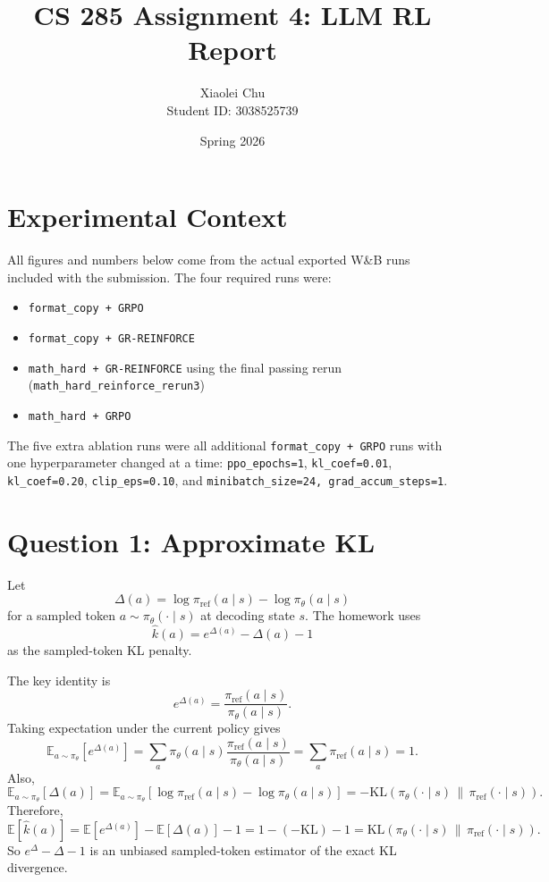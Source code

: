\documentclass[11pt]{article}
\title{\textbf{CS 285 Assignment 4: LLM RL Report}}
\author{Xiaolei Chu \\ Student ID: 3038525739}
\date{Spring 2026}
\begin{document}
\maketitle

\section*{Experimental Context}
All figures and numbers below come from the actual exported W\&B runs included with the submission. The four required runs were:
\begin{itemize}[leftmargin=1.4em]
\item \texttt{format\_copy + GRPO}
\item \texttt{format\_copy + GR-REINFORCE}
\item \texttt{math\_hard + GR-REINFORCE} using the final passing rerun (\texttt{math\_hard\_reinforce\_rerun3})
\item \texttt{math\_hard + GRPO}
\end{itemize}

The five extra ablation runs were all additional \texttt{format\_copy + GRPO} runs with one hyperparameter changed at a time:
\texttt{ppo\_epochs=1}, \texttt{kl\_coef=0.01}, \texttt{kl\_coef=0.20}, \texttt{clip\_eps=0.10}, and \texttt{minibatch\_size=24, grad\_accum\_steps=1}.

\section{Question 1: Approximate KL}
Let
\[
\Delta(a) = \log \pi_{\mathrm{ref}}(a \mid s) - \log \pi_{\theta}(a \mid s)
\]
for a sampled token \(a \sim \pi_\theta(\cdot \mid s)\) at decoding state \(s\). The homework uses
\[
\hat{k}(a) = e^{\Delta(a)} - \Delta(a) - 1
\]
as the sampled-token KL penalty.

The key identity is
\[
e^{\Delta(a)} = \frac{\pi_{\mathrm{ref}}(a \mid s)}{\pi_\theta(a \mid s)}.
\]
Taking expectation under the current policy gives
\[
\mathbb{E}_{a \sim \pi_\theta}\!\left[e^{\Delta(a)}\right]
= \sum_a \pi_\theta(a \mid s) \frac{\pi_{\mathrm{ref}}(a \mid s)}{\pi_\theta(a \mid s)}
= \sum_a \pi_{\mathrm{ref}}(a \mid s)
= 1.
\]
Also,
\[
\mathbb{E}_{a \sim \pi_\theta}\!\left[\Delta(a)\right]
= \mathbb{E}_{a \sim \pi_\theta}\!\left[\log \pi_{\mathrm{ref}}(a \mid s) - \log \pi_\theta(a \mid s)\right]
= - \mathrm{KL}\!\left(\pi_\theta(\cdot \mid s)\,\|\,\pi_{\mathrm{ref}}(\cdot \mid s)\right).
\]
Therefore,
\[
\mathbb{E}[\hat{k}(a)]
= \mathbb{E}[e^{\Delta(a)}] - \mathbb{E}[\Delta(a)] - 1
= 1 - (-\mathrm{KL}) - 1
= \mathrm{KL}\!\left(\pi_\theta(\cdot \mid s)\,\|\,\pi_{\mathrm{ref}}(\cdot \mid s)\right).
\]
So \(e^{\Delta}-\Delta-1\) is an unbiased sampled-token estimator of the exact KL divergence.
\end{document}
